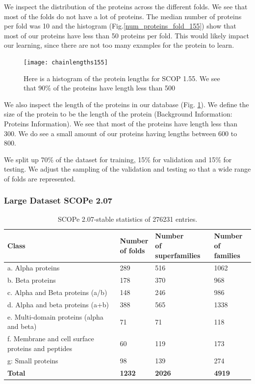 \documentclass[12pt, a4paper, twocolumn, fullpage]{article}
\theoremstyle{plain}
\theoremstyle{definition}
\theoremstyle{remark}
\begin{document}
We inspect the distribution of the proteins across the different folds. We see that most of the folds do not have a lot of proteins. The median number of proteins per fold was 10 and the histogram (Fig.\ref{num_proteins_fold_155}) show that most of our proteins have less than 50 proteins per fold. This would likely impact our learning, since there are not too many examples for the protein to learn.


\begin{figure}
    \texttt{[image: chainlengths155]}
    \caption{Here is a histogram of the protein lengths for SCOP 1.55. We see that 90\% of the proteins have length less than 500}
    \label{chainlengths155}
\end{figure}

We also inspect the length of the proteins in our database (Fig. \ref{chainlengths155}). We define the size of the protein to be the length of the protein (Background Information: Proteins Information). We see that most of the proteins have length less than 300. We do see a small amount of our proteins having lengths between 600 to 800. 

We split up 70\% of the dataset for training, 15\% for validation and 15\% for testing. We adjust the sampling of the validation and testing so that a wide range of folds are represented.

\subsubsection{Large Dataset SCOPe 2.07}

\begin{table}[h]
    \centering
    \begin{tabular}{| l | l | l | l |}
        \hline 
        Class & \makecell{Number \\ of folds} & \makecell{Number  \\ of superfamilies} & \makecell{Number \\ of families} \\ \hline
        a. Alpha proteins & 289 & 516 & 1062 \\ \hline
        b. Beta proteins & 178 & 370 & 968 \\ \hline
        c. Alpha and Beta proteins (a/b) & 148 & 246 & 986 \\ \hline
        d. Alpha and beta proteins (a+b) & 388 & 565 & 1338 \\ \hline  \hline
        e. Multi-domain proteins (alpha and beta) & 71 & 71 & 118 \\ \hline
        \makecell[l]{f. Membrane and cell surface \\ proteins and peptides} & 60 & 119 & 173 \\ \hline
        g: Small proteins & 98 & 139 & 274 \\ \hline
        \textbf{Total} & \textbf{1232} & \textbf{2026} & \textbf{4919}  \\ \hline
        \hline
    \end{tabular}
    \caption{ SCOPe 2.07-stable statistics of 276231 entries. }
    \label{}
\end{table}
\end{document}
